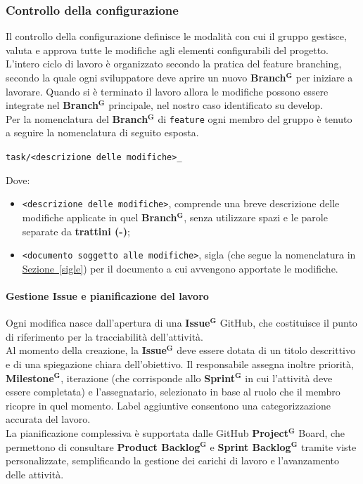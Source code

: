 \documentclass[a4paper,12pt]{article}
\newcommand{\term}[1]{\textbf{#1}$^\mathbf{G}$}
\newcommand{\ignoreglossary}{}
\begin{document}
\subsubsection{Controllo della configurazione}
Il controllo della configurazione definisce le modalità con cui il gruppo gestisce, valuta e approva tutte le modifiche agli elementi configurabili del progetto.\\
L’intero ciclo di lavoro è organizzato secondo la pratica del feature branching, secondo la quale ogni sviluppatore deve aprire un nuovo \term{Branch} per iniziare a lavorare. Quando si è terminato il lavoro allora le modifiche possono essere integrate nel \term{Branch} principale, nel nostro caso identificato su develop.\\
Per la nomenclatura del \term{Branch} di \texttt{feature} ogni membro del gruppo è tenuto a seguire la nomenclatura di seguito esposta.
\begin{center}
    \texttt{task/<descrizione delle modifiche>\_<documento soggetto alle modifiche>}
\end{center}
Dove:
\begin{itemize}
    \item \texttt{<descrizione delle modifiche>}, comprende una breve descrizione delle modifiche applicate in quel \term{Branch}, senza utilizzare spazi e le parole separate da \textbf{trattini (-)};
    \item \texttt{<documento soggetto alle modifiche>}, sigla (che segue la nomenclatura in \hyperref[sigle]{Sezione~\ref*{sigle}}) per il documento a cui avvengono apportate le modifiche.
\end{itemize}

\paragraph{Gestione \ignoreglossary{Issue} e pianificazione del lavoro}
Ogni modifica nasce dall’apertura di una \term{Issue} GitHub, che costituisce il punto di riferimento per la tracciabilità dell’attività.\\ 
Al momento della creazione, la \term{Issue} deve essere dotata di un titolo descrittivo e di una spiegazione chiara dell’obiettivo. Il responsabile assegna inoltre priorità, \term{Milestone}, iterazione (che corrisponde allo \term{Sprint} in cui l’attività deve essere completata) e l’assegnatario, selezionato in base al ruolo che il membro ricopre in quel momento. Label aggiuntive consentono una categorizzazione accurata del lavoro.\\ 
La pianificazione complessiva è supportata dalle GitHub \term{Project} Board, che permettono di consultare \term{Product Backlog} e \term{Sprint Backlog} tramite viste personalizzate, semplificando la gestione dei carichi di lavoro e l’avanzamento delle attività.
\end{document}
